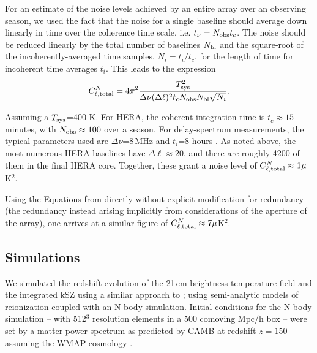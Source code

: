 For an estimate of the noise levels achieved by an entire array over an observing season, we used the fact that the noise for a single baseline should average down linearly in time over the coherence time scale, i.e. $t_{\nu} = N_{\rm obs}t_c$. The noise should be reduced linearly by the total number of baselines $N_{\rm bl}$ and the square-root of the incoherently-averaged time samples, $N_i = t_i/t_c$, for the length of time for incoherent time averages $t_i$. This leads to the expression
\begin{equation}
C^N_{\ell,{\rm total}} = 4\pi^2\frac{T_{\rm sys}^2}{\Delta\nu(\Delta\ell)^2 t_c N_{\rm obs} N_{\rm bl}\sqrt{N_i}}.
\label{eq:ksz_21cm_HERA_noise_total}
\end{equation}

Assuming a $T_{\rm sys}$=400 K. For HERA, the coherent integration time is $t_c\approx 15$\,minutes, with $N_{\rm obs}\approx100$ over a season. For delay-spectrum measurements, the typical parameters used are $\Delta\nu$=8\,MHz and $t_i$=8 hours \citep{Ali.15}. As noted above, the most numerous HERA baselines have $\Delta\ell\approx 20$, and there are roughly 4200 of them in the final HERA core. Together, these grant a noise level of $C^N_{\ell,{\rm total}}\approx 1 \mu$K$^2$.

Using the Equations from \cite{Zaldarriaga.04} directly without explicit modification for redundancy (the redundancy instead arising implicitly from considerations of the aperture of the array), one arrives at a similar figure of $C^N_{\ell,{\rm total}}\approx 7 \mu$K$^2$.

\subsection{Simulations}

We simulated the redshift evolution of the 21\,cm brightness temperature field and the integrated kSZ using a similar approach to \cite{LaPlante.14}; using semi-analytic models of reionization coupled with an N-body simulation. Initial conditions for the N-body simulation -- with 512$^3$ resolution elements in a 500 comoving Mpc/h box -- were set by a matter power spectrum as predicted by CAMB \citep{Lewis.99} at redshift $z=150$ assuming the WMAP cosmology \citep{Hinshaw.13}.

